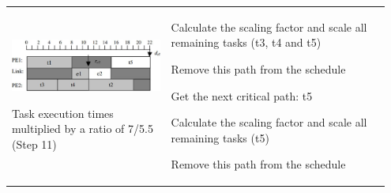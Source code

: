 \begin{longtable}{p{0.4\linewidth}p{0.55\linewidth}}
			\vspace{0pt}
				
			\includegraphics[scale=0.3]{./pictures/voltage_scheduling_4.png}
			
			Task execution times multiplied by a ratio of 7/5.5 (Step 11)			
			&
				\begin{compactenum}	
					\setcounter{enumi}{7}
					\item Calculate the scaling factor and scale all remaining tasks (t3, t4 and t5)
					\item Remove this path from the schedule	
					\item Get the next critical path: t5
					\item Calculate the scaling factor and scale all remaining tasks (t5)
					\item Remove this path from the schedule
				\end{compactenum}	\\
		\end{longtable}
	
%	
%	
%	
